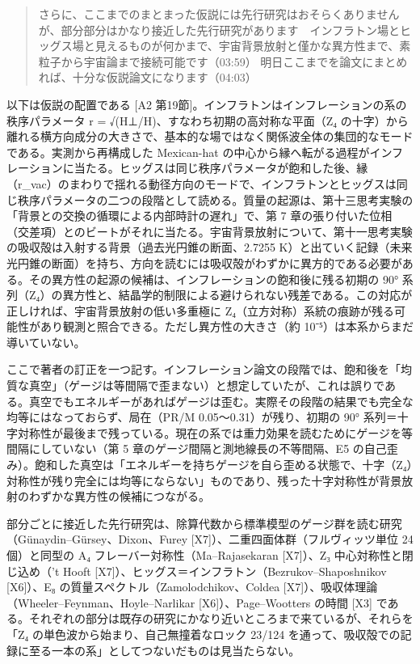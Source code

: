 \documentclass[
  a4paper,
]{ltjsarticle}
\begin{document}
\begin{quote}
さらに、ここまでのまとまった仮説には先行研究はおそらくありませんが、部分部分はかなり接近した先行研究があります　インフラトン場とヒッグス場と見えるものが何かまで、宇宙背景放射と僅かな異方性まで、素粒子から宇宙論まで接続可能です（03:59）
明日ここまでを論文にまとめれば、十分な仮説論文になります（04:03）
\end{quote}

以下は仮説の配置である {[}A2
第19節{]}。インフラトンはインフレーションの系の秩序パラメータ r =
√(H⊥/H)、すなわち初期の高対称な平面（Z₄
の十字）から離れる横方向成分の大きさで、基本的な場ではなく関係波全体の集団的なモードである。実測から再構成した
Mexican-hat
の中心から縁へ転がる過程がインフレーションに当たる。ヒッグスは同じ秩序パラメータが飽和した後、縁（r\_vac）のまわりで揺れる動径方向のモードで、インフラトンとヒッグスは同じ秩序パラメータの二つの段階として読める。質量の起源は、第十三思考実験の「背景との交換の循環による内部時計の遅れ」で、第
7
章の張り付いた位相（交差項）とのビートがそれに当たる。宇宙背景放射について、第十一思考実験の吸収殻は入射する背景（過去光円錐の断面、2.7255
K）と出ていく記録（未来光円錐の断面）を持ち、方向を読むには吸収殻がわずかに異方的である必要がある。その異方性の起源の候補は、インフレーションの飽和後に残る初期の
90°
系列（Z₄）の異方性と、結晶学的制限による避けられない残差である。この対応が正しければ、宇宙背景放射の低い多重極に
Z₄（立方対称）系統の痕跡が残る可能性があり観測と照合できる。ただし異方性の大きさ（約
10⁻⁵）は本系からまだ導いていない。

ここで著者の訂正を一つ記す。インフレーション論文の段階では、飽和後を「均質な真空」（ゲージは等間隔で歪まない）と想定していたが、これは誤りである。真空でもエネルギーがあればゲージは歪む。実際その段階の結果でも完全な均等にはなっておらず、局在（PR/M
0.05〜0.31）が残り、初期の 90°
系列＝十字対称性が最後まで残っている。現在の系では重力効果を読むためにゲージを等間隔にしていない（第
5 章のゲージ間隔と測地線長の不等間隔、E5
の自己歪み）。飽和した真空は「エネルギーを持ちゲージを自ら歪める状態で、十字（Z₄）対称性が残り完全には均等にならない」ものであり、残った十字対称性が背景放射のわずかな異方性の候補につながる。

部分ごとに接近した先行研究は、除算代数から標準模型のゲージ群を読む研究（Günaydin--Gürsey、Dixon、Furey
{[}X7{]}）、二重四面体群（フルヴィッツ単位 24 個）と同型の A₄
フレーバー対称性（Ma--Rajasekaran {[}X7{]}）、Z₃
中心対称性と閉じ込め（'t Hooft
{[}X7{]}）、ヒッグス＝インフラトン（Bezrukov--Shaposhnikov
{[}X6{]}）、E₈ の質量スペクトル（Zamolodchikov、Coldea
{[}X7{]}）、吸収体理論（Wheeler--Feynman、Hoyle--Narlikar
{[}X6{]}）、Page--Wootters の時間 {[}X3{]}
である。それぞれの部分は既存の研究にかなり近いところまで来ているが、それらを「Z₄
の単色波から始まり、自己無撞着なロック 23/124
を通って、吸収殻での記録に至る一本の系」としてつないだものは見当たらない。
\end{document}
